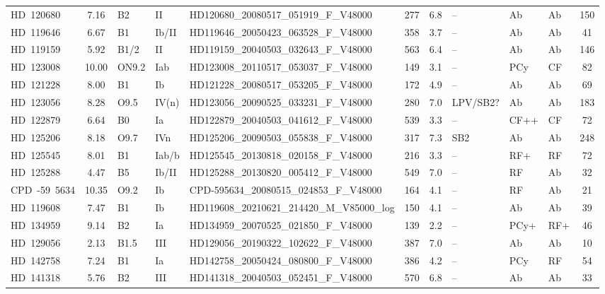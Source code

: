 {\begin{landscape}
\begin{longtable}{lclllcclllc}
\noalign{\smallskip}
HD~120680 & 7.16 & B2 & II & HD120680\_20080517\_051919\_F\_V48000 & 277 & 6.8 & -- & Ab & Ab & 150 \\
\noalign{\smallskip}
HD~119646 & 6.67 & B1 & Ib/II & HD119646\_20050423\_063528\_F\_V48000 & 358 & 3.7 & -- & Ab & Ab & 41 \\
\noalign{\smallskip}
HD~119159 & 5.92 & B1/2 & II & HD119159\_20040503\_032643\_F\_V48000 & 563 & 6.4 & -- & Ab & Ab & 146 \\
\noalign{\smallskip}
HD~123008 & 10.00 & ON9.2 & Iab & HD123008\_20110517\_053037\_F\_V48000 & 149 & 3.1 & -- & PCy & CF & 82 \\
\noalign{\smallskip}
HD~121228 & 8.00 & B1 & Ib & HD121228\_20080517\_053205\_F\_V48000 & 172 & 4.9 & -- & Ab & Ab & 69 \\
\noalign{\smallskip}
HD~123056 & 8.28 & O9.5 & IV(n) & HD123056\_20090525\_033231\_F\_V48000 & 280 & 7.0 & LPV/SB2? & Ab & Ab & 183 \\
\noalign{\smallskip}
HD~122879 & 6.64 & B0 & Ia & HD122879\_20040503\_041612\_F\_V48000 & 539 & 3.3 & -- & CF++ & CF & 72 \\
\noalign{\smallskip}
HD~125206 & 8.18 & O9.7 & IVn & HD125206\_20090503\_055838\_F\_V48000 & 317 & 7.3 & SB2 & Ab & Ab & 248 \\
\noalign{\smallskip}
HD~125545 & 8.01 & B1 & Iab/b & HD125545\_20130818\_020158\_F\_V48000 & 216 & 3.3 & -- & RF+ & RF & 72 \\
\noalign{\smallskip}
HD~125288 & 4.47 & B5 & Ib/II & HD125288\_20130820\_005412\_F\_V48000 & 549 & 7.0 & -- & RF & Ab & 32 \\
\noalign{\smallskip}
CPD~-59~5634 & 10.35 & O9.2 & Ib & CPD-595634\_20080515\_024853\_F\_V48000 & 164 & 4.1 & -- & RF & Ab & 21 \\
\noalign{\smallskip}
HD~119608 & 7.47 & B1 & Ib & HD119608\_20210621\_214420\_M\_V85000\_log & 150 & 4.1 & -- & Ab & Ab & 39 \\
\noalign{\smallskip}
HD~134959 & 9.14 & B2 & Ia & HD134959\_20070525\_021850\_F\_V48000 & 139 & 2.2 & -- & PCy+ & RF+ & 46 \\
\noalign{\smallskip}
HD~129056 & 2.13 & B1.5 & III & HD129056\_20190322\_102622\_F\_V48000 & 387 & 7.0 & -- & Ab & Ab & 10 \\
\noalign{\smallskip}
HD~142758 & 7.24 & B1 & Ia & HD142758\_20050424\_080800\_F\_V48000 & 386 & 4.2 & -- & PCy & RF & 54 \\
\noalign{\smallskip}
HD~141318 & 5.76 & B2 & III & HD141318\_20040503\_052451\_F\_V48000 & 570 & 6.8 & -- & Ab & Ab & 33 \\

\end{longtable}
\end{landscape}}
